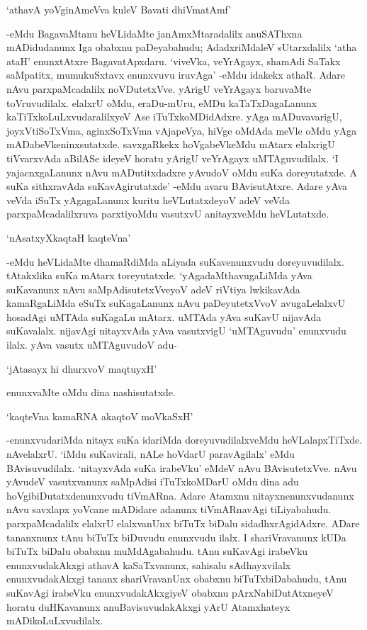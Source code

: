 \begin{shloka}
`athavA yoVginAmeVva kuleV Bavati dhiVmatAmf'
\end{shloka}

-eMdu BagavaMtanu heVLidaMte janAmxMtaradalilx anuSAThxna mADidudanunx Iga obabxnu paDeyabahudu; AdadxriMdaleV sUtarxdalilx `atha ataH' enunxtAtxre BagavatApxdaru. `viveVka, veYrAgayx, shamAdi SaTakx saMpatitx, mumukuSxtavx enunxvuvu iruvAga' -eMdu idakekx athaR. Adare nAvu parxpaMcadalilx noVDutetxVve. yArigU veYrAgayx baruvaMte toVruvudilalx. elalxrU oMdu, eraDu-mUru, eMDu kaTaTxDagaLanunx kaTiTxkoLuLxvudaralilxyeV Ase iTuTxkoMDidAdxre. yAga mADuvavarigU, joyxVtiSoTxVma, aginxSoTxVma vAjapeVya, hiVge oMdAda meVle oMdu yAga mADabeVkeninxsutatxde. savxgaRkekx hoVgabeVkeMdu mAtarx elalxrigU tiVvarxvAda aBilASe ideyeV horatu yArigU veYrAgayx uMTAguvudilalx. `I yajacnxgaLanunx nAvu mADutitxdadxre yAvudoV oMdu suKa doreyutatxde. A suKa sithxravAda suKavAgirutatxde' -eMdu avaru BAvisutAtxre. Adare yAva veVda iSuTx yAgagaLanunx kuritu heVLutatxdeyoV adeV veVda parxpaMcadalilxruva parxtiyoMdu vasutxvU anitayxveMdu heVLutatxde.

\begin{shloka}
`nAsatxyXkaqtaH kaqteVna'
\end{shloka}

-eMdu heVLidaMte dhamaRdiMda aLiyada suKavenunxvudu doreyuvudilalx. tAtakxlika suKa mAtarx toreyutatxde. `yAgadaMthavugaLiMda yAva suKavanunx nAvu saMpAdisutetxVveyoV adeV riVtiya lwkikavAda kamaRgaLiMda eSuTx suKagaLanunx nAvu paDeyutetxVvoV avugaLelalxvU hosadAgi uMTAda suKagaLu mAtarx. uMTAda yAva suKavU nijavAda suKavalalx. nijavAgi nitayxvAda yAva vasutxvigU `uMTAguvudu' enunxvudu ilalx. yAva vasutx uMTAguvudoV adu-

\begin{shloka}
`jAtasayx hi dhurxvoV maqtuyxH'
\end{shloka}

enunxvaMte oMdu dina nashisutatxde.

\begin{shloka}
`kaqteVna kamaRNA akaqtoV moVkaSxH'
\end{shloka}

-enunxvudariMda nitayx suKa idariMda doreyuvudilalxveMdu heVLalapxTiTxde. nAvelalxrU. `iMdu suKavirali, nALe hoVdarU paravAgilalx' eMdu BAvisuvudilalx. `nitayxvAda suKa irabeVku' eMdeV nAvu BAvisutetxVve. nAvu yAvudeV vasutxvanunx saMpAdisi iTuTxkoMDarU oMdu dina adu hoVgibiDutatxdenunxvudu tiVmARna. Adare Atamxnu nitayxnenunxvudanunx nAvu savxlapx yoVcane mADidare adanunx tiVmARnavAgi tiLiyabahudu. parxpaMcadalilx elalxrU elalxvanUnx biTuTx biDalu sidadhxrAgidAdxre. ADare tananxnunx tAnu biTuTx biDuvudu enunxvudu ilalx. I shariVravanunx kUDa biTuTx biDalu obabxnu muMdAgabahudu. tAnu suKavAgi irabeVku enunxvudakAkxgi athavA kaSaTxvanunx, sahisalu sAdhayxvilalx enunxvudakAkxgi tananx shariVravanUnx obabxnu biTuTxbiDabahudu, tAnu suKavAgi irabeVku enunxvudakAkxgiyeV obabxnu pArxNabiDutAtxneyeV horatu duHKavanunx anuBavisuvudakAkxgi yArU Atamxhateyx mADikoLuLxvudilalx.

